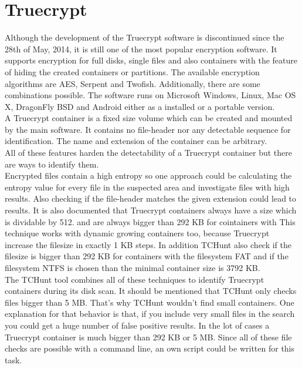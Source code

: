 \section{Truecrypt}
Although the development of the Truecrypt software is discontinued since the 28th of May, 2014, it is still one of the most popular encryption software.
It supports encryption for full disks, single files and also containers with the feature of hiding the created containers or partitions.
The available encryption algorithms are AES, Serpent and Twofish. Additionally, there are some combinations possible.
The software runs on Microsoft Windows, Linux, Mac OS X, DragonFly BSD and Android either as a installed or a portable version.\cite{wiki:truecrypt}
\\
A Truecrypt container is a fixed size volume which can be created and mounted by the main software.
It contains no file-header nor any detectable sequence for identification.
The name and extension of the container can be arbitrary.\\
All of these features harden the detectability of a Truecrypt container but there are ways to identify them.
\\
Encrypted files contain a high entropy so one approach could be calculating the entropy value for every file in the suspected area and investigate files with high results.
Also checking if the file-header matches the given extension could lead to results.
It is also documented that Truecrypt containers always have a size which is dividable by 512.
and are always bigger than 292 KB for cointainers with
This technique works with dynamic growing containers too, because Truecrypt increase the filesize in exactly 1 KB steps. In addition TCHunt also check if the filesize is bigger than 292 KB for containers with the filesystem FAT and if the filesystem NTFS is chosen than the minimal container size is 3792 KB.
\cite{truecrypt:sourceCode}
\\
The TCHunt tool combines all of these techniques to identify Truecrypt containers during its disk scan. It should be mentioned that TCHunt only checks files bigger than 5 MB.
That's why TCHunt wouldn't find small containers. One explanation for that behavior is that, if you include very small files in the search you could get a huge number of false positive results. In the lot of cases a Truecrypt container is much bigger than 292 KB or 5 MB. 
Since all of these file checks are possible with a command line, an own script could be written for this task.

